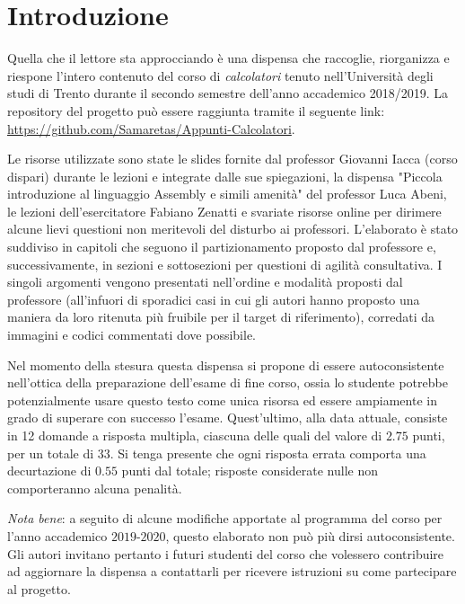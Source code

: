 \documentclass[class=book, crop=false, oneside]{standalone}
\begin{document}
\chapter*{Introduzione}

Quella che il lettore sta approcciando è una dispensa che raccoglie, riorganizza e riespone l'intero contenuto del corso di \emph{calcolatori} tenuto nell'Università degli studi di Trento durante il secondo semestre dell'anno accademico 2018/2019. La repository del progetto può essere raggiunta tramite il seguente link: \url{https://github.com/Samaretas/Appunti-Calcolatori}.

Le risorse utilizzate sono state le slides fornite dal professor Giovanni Iacca (corso dispari) durante le lezioni e integrate dalle sue spiegazioni, la dispensa "Piccola introduzione al linguaggio Assembly e simili amenità" del professor Luca Abeni, le lezioni dell'esercitatore Fabiano Zenatti e svariate risorse online per dirimere alcune lievi questioni non meritevoli del disturbo ai professori. L'elaborato è stato suddiviso in capitoli che seguono il partizionamento proposto dal professore e, successivamente, in sezioni e sottosezioni per questioni di agilità consultativa. I singoli argomenti vengono presentati nell'ordine e modalità proposti dal professore (all'infuori di sporadici casi in cui gli autori hanno proposto una maniera da loro ritenuta più fruibile per il target di riferimento), corredati da immagini e codici commentati dove possibile.

Nel momento della stesura questa dispensa si propone di essere autoconsistente nell'ottica della preparazione dell'esame di fine corso, ossia lo studente potrebbe potenzialmente usare questo testo come unica risorsa ed essere ampiamente in grado di superare con successo l'esame. Quest'ultimo, alla data attuale, consiste in 12 domande a risposta multipla, ciascuna delle quali del valore di \(2.75\) punti, per un totale di \(33\). Si tenga presente che ogni risposta errata comporta una decurtazione di \(0.55\) punti dal totale; risposte considerate nulle non comporteranno alcuna penalità.

\emph{Nota bene}: a seguito di alcune modifiche apportate al programma del corso per l'anno accademico \(2019\)-\(2020\), questo elaborato non può più dirsi autoconsistente. Gli autori invitano pertanto i futuri studenti del corso che volessero contribuire ad aggiornare la dispensa a contattarli per ricevere istruzioni su come partecipare al progetto.
\end{document}
